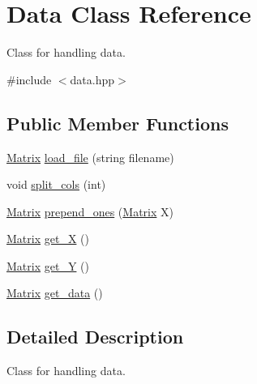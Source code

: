 \hypertarget{classData}{\section{Data Class Reference}
\label{classData}
}


Class for handling data.  




{\ttfamily \#include $<$data.\-hpp$>$}

\subsection*{Public Member Functions}
\begin{DoxyCompactItemize}
\item 
\hyperlink{classMatrix}{Matrix} \hyperlink{classData_a0637899de992e96ed4b8eeb6362f252b}{load\-\_\-file} (string filename)
\item 
void \hyperlink{classData_a7cf1bb80d6516b9c1c9da3d0af30b7c2}{split\-\_\-cols} (int)
\item 
\hyperlink{classMatrix}{Matrix} \hyperlink{classData_a3e5387c97322f99c12eab3d260ee9a1f}{prepend\-\_\-ones} (\hyperlink{classMatrix}{Matrix} X)
\item 
\hyperlink{classMatrix}{Matrix} \hyperlink{classData_a9090d93c356895c33b3318a9ab45db40}{get\-\_\-\-X} ()
\item 
\hyperlink{classMatrix}{Matrix} \hyperlink{classData_a727e28db554b734b04acc811507f96fc}{get\-\_\-\-Y} ()
\item 
\hyperlink{classMatrix}{Matrix} \hyperlink{classData_a926575c51977c29c177b4ed1e8297ea9}{get\-\_\-data} ()
\end{DoxyCompactItemize}


\subsection{Detailed Description}
Class for handling data. 

